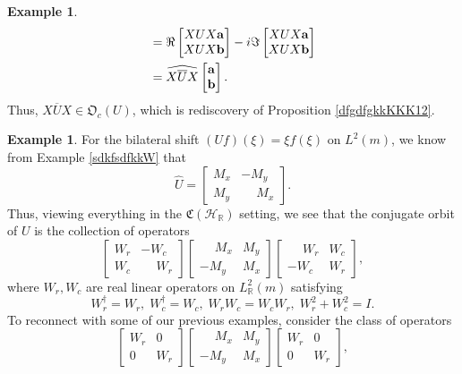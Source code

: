 \documentclass{dis}
\theoremstyle{plain}
\theoremstyle{definition}
\newtheorem{Example}[equation]{Example}
\def\R{\mathbb{R}}
\renewcommand{\vec}[1]{{\bf #1}}
\newcommand{\0}{{\color{lightgray}0}}
\begin{document}
\begin{Example}
\begin{align*}
& = \Re \begin{bmatrix} XUX \vec{a}\\ XUX \vec{b}\end{bmatrix}  - i \Im  \begin{bmatrix} XUX \vec{a} \\ XUX \vec{b}\end{bmatrix}\\
& = \widehat{X \overline{U}X} \begin{bmatrix} \vec{a}\\\vec{b}\end{bmatrix}.
\end{align*}
Thus, $X \overline{U} X \in \mathfrak{O}_c(U)$, which is rediscovery of Proposition \ref{dfgdfgkkKKK12}.
\end{Example}

\begin{Example}
For the bilateral shift $(U f)(\xi) = \xi f(\xi)$ on $L^2(m)$, we know from Example \ref{sdkfsdfkkW} that
$$\widehat{U} = \begin{bmatrix} M_{x} & - M_{y}\\ M_{y} & \phantom{-}M_{x}\end{bmatrix}.$$
Thus, viewing everything in the $\mathfrak{C}(\mathcal{H}_{\R})$ setting, we see that the conjugate orbit of $U$ is the collection of operators 
$$ \begin{bmatrix} W_{r} & -W_{c}\\ W_{c} & \phantom{-}W_{r}\end{bmatrix}  \begin{bmatrix} \phantom{-}M_{x} &  M_{y}\\ - M_{y} & M_{x}\end{bmatrix}  \begin{bmatrix} \phantom{-}W_{r} & W_{c}\\ -W_{c} & W_{r}\end{bmatrix},$$
where $W_{r}, W_{c}$  are real linear operators on $L^{2}_{\R}(m)$ satisfying 
$$W_{r}^{\dagger} = W_{r}, \; W_{c}^{\dagger} = W_{c}, \; W_{r} W_{c} = W_{c} W_{r}, \;  W_{r}^{2} + W_{c}^{2} = I.$$
To reconnect with some of our previous examples, consider the class of operators
$$ \begin{bmatrix} W_{r} & 0\\ 0 & W_{r}\end{bmatrix}  \begin{bmatrix} \phantom{-}M_{x} &  M_{y}\\ -M_{y} & M_{x}\end{bmatrix}  \begin{bmatrix} W_{r} &0\\ 0& W_{r}\end{bmatrix},$$

\end{Example}
\end{document}
